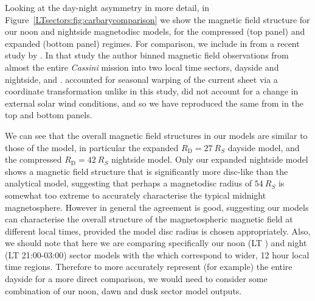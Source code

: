 Looking at the day-night asymmetry in more detail, in Figure~\ref{LTsectors:fig:carbarycomparison} we show the magnetic field structure for our noon and nightside magnetodisc models, for the compressed (top panel) and expanded (bottom panel) regimes. For comparison, we include in   from a recent study by \citet{carbary2018}. In that study the author binned magnetic field observations from almost the entire \textit{Cassini} mission into two local time sectors, dayside and nightside, and . \citet{carbary2018} accounted for seasonal warping of the current sheet via a coordinate transformation unlike in this study, \citet{carbary2018} did not account for a change in external solar wind conditions, and so we have reproduced the same  from \citet{carbary2018} in the top and bottom panels. 

We can see that the overall magnetic field structures in our models are similar to those of the \citet{carbary2018} model, in particular the expanded $R_\mathrm{D} = \SI{27}{R_S}$ dayside model, and the compressed $R_\mathrm{D} = \SI{42}{R_S}$ nightside model. Only our expanded nightside model shows a magnetic field structure that is significantly more disc-like than the \citet{carbary2018} analytical model, suggesting that perhaps a magnetodisc radius of $\SI{54}{R_S}$ is somewhat too extreme to accurately characterise the typical midnight magnetosphere. However in general the agreement is good, suggesting our models can characterise the overall structure of the magnetospheric magnetic field at different local times, provided the model disc radius is chosen appropriately. Also, we should note that here we are comparing specifically our noon (LT ) and night (LT 21:00-03:00) sector models with the \citet{carbary2018}  which correspond to wider, 12 hour local time regions. Therefore to more accurately represent (for example) the entire dayside for a more direct comparison, we would need to consider some combination of our noon, dawn and dusk sector model outputs.

